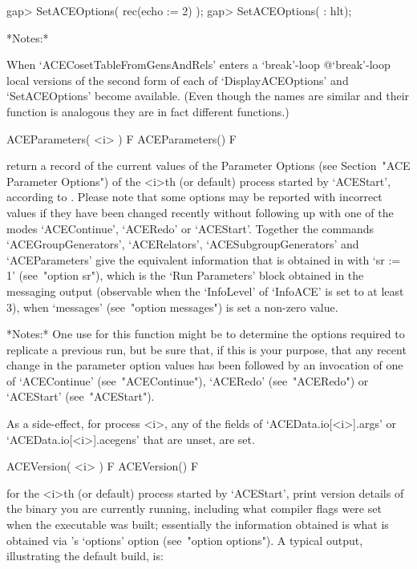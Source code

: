 \beginexample
gap> SetACEOptions( rec(echo := 2) );
gap> SetACEOptions( : hlt);
\endexample

*Notes:*

When `ACECosetTableFromGensAndRels' enters a  `break'-loop{\undoquotes
{} {@`break'-loop}} local versions  of  the  second
form  of  each  of  `DisplayACEOptions'  and  `SetACEOptions'   become
available. (Even though the names are similar and  their  function  is
analogous they are in fact different functions.)

\>ACEParameters( <i> ) F
\>ACEParameters() F

return a record of the current values of the {\ACE} Parameter  Options
(see Section~"ACE  Parameter  Options")  of  the  <i>th  (or  default)
process started by `ACEStart', according to {\ACE}. Please  note  that
some options may be reported with incorrect values if they  have  been
changed  recently  without  following  up  with  one  of   the   modes
`ACEContinue',  `ACERedo'  or  `ACEStart'.   Together   the   commands
`ACEGroupGenerators',   `ACERelators',   `ACESubgroupGenerators'   and
`ACEParameters'  give  the  equivalent  {\GAP}  information  that   is
obtained in {\ACE} with `sr := 1'  (see~"option  sr"),  which  is  the
\lq{}Run  Parameters'  block  obtained   in   the   messaging   output
(observable when the `InfoLevel' of `InfoACE' is set to at  least  3),
when `messages' (see~"option messages") is set a non-zero value.

*Notes:*
One use for this function might be to determine the  options  required
to replicate a previous run,  but  be  sure  that,  if  this  is  your
purpose, that any recent change in the  parameter  option  values  has
been   followed   by   an   invocation   of   one   of   `ACEContinue'
(see~"ACEContinue"),   `ACERedo'   (see~"ACERedo")    or    `ACEStart'
(see~"ACEStart").

As a side-effect, for  {\ACE}  process  <i>,  any  of  the  fields  of
`ACEData.io[<i>].args' or `ACEData.io[<i>].acegens'  that  are  unset,
are set.

\>ACEVersion( <i> ) F
\>ACEVersion() F

for the <i>th  (or  default)  process  started  by  `ACEStart',  print
version details of  the  {\ACE}  binary  you  are  currently  running,
including what compiler flags were set when the executable was  built;
essentially the information obtained is what is obtained via  {\ACE}'s
`options'   option   (see~"option   options").   A   typical   output,
illustrating the default build, is:


